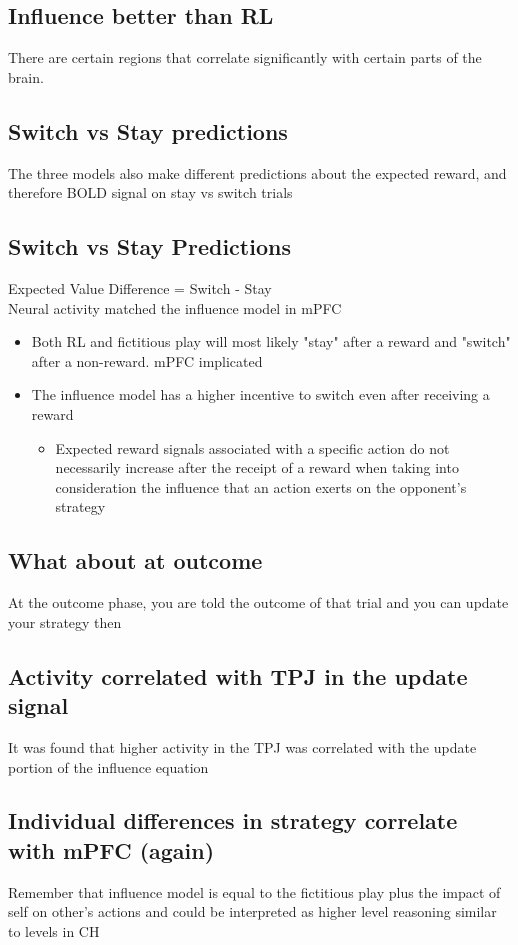 \subsection{Influence better than RL}
There are certain regions that correlate significantly with certain parts of the brain.
\subsection{Switch vs Stay predictions}
The three models also make different predictions about the expected reward, and therefore BOLD signal on stay vs switch trials
\subsection{Switch vs Stay Predictions}
Expected Value Difference = Switch - Stay
\\Neural activity matched the influence model in mPFC
\begin{itemize}
    \item Both RL and fictitious play will most likely "stay" after a reward and "switch" after a non-reward. mPFC implicated
    \item The influence model has a higher incentive to switch even after receiving a reward
    \begin{itemize}
        \item Expected reward signals associated with a specific action do not necessarily increase after the receipt of a reward when taking into consideration the influence that an action exerts on the opponent's strategy
    \end{itemize}
\end{itemize}
\subsection{What about at outcome}
At the outcome phase, you are told the outcome of that trial and you can update your strategy then
\subsection{Activity correlated with TPJ in the update signal}
It was found that higher activity in the TPJ was correlated with the update portion of the influence equation
\subsection{Individual differences in strategy correlate with mPFC (again)}
Remember that influence model is equal to the fictitious play plus the impact of self on other's actions and could be interpreted as higher level reasoning similar to levels in CH
